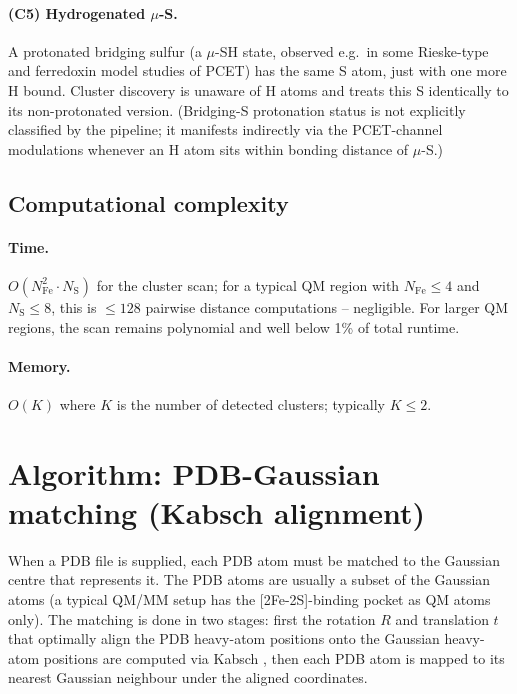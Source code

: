 \documentclass[10pt,a4paper,twoside]{article}
\newcommand{\codref}[1]{%
  \quad\text{\textcolor{gray!70!black}{\footnotesize $\rightsquigarrow$~\texttt{#1}}}}
\begin{document}
\paragraph{(C5) Hydrogenated $\mu$-S.}
A protonated bridging sulfur (a $\mu$-SH state, observed e.g.\ in
some Rieske-type and ferredoxin model studies of PCET) has the
same S atom, just with one more H bound. Cluster discovery is
unaware of H atoms and treats this S identically to its
non-protonated version. (Bridging-S protonation status is not
explicitly
classified by the pipeline; it manifests indirectly via the
PCET-channel modulations whenever an H atom sits within bonding
distance of $\mu$-S.)

\subsection{Computational complexity}

\paragraph{Time.}
$O(N_\text{Fe}^2 \cdot N_\text{S})$ for the cluster scan; for a
typical QM region with $N_\text{Fe} \leq 4$ and $N_\text{S} \leq 8$,
this is $\leq 128$ pairwise distance computations -- negligible.
For larger QM regions, the scan remains polynomial and well below
1\% of total runtime.

\paragraph{Memory.}
$O(K)$ where $K$ is the number of detected clusters; typically
$K \leq 2$.

\section{Algorithm: PDB-Gaussian matching (Kabsch alignment)}
\label{sec:kabsch}

\codref{geometry.kabsch\_align}

When a PDB file is supplied, each PDB atom must be matched to the
Gaussian centre that represents it. The PDB atoms are usually a
subset of the Gaussian atoms (a typical QM/MM setup has the
[2Fe-2S]-binding pocket as QM atoms only). The matching is done in
two stages: first the rotation $R$ and translation $t$ that
optimally align the PDB heavy-atom positions onto the Gaussian
heavy-atom positions are computed via Kabsch \cite{Kabsch1976},
then each PDB atom is mapped to its nearest Gaussian neighbour
under the aligned coordinates.
\end{document}
